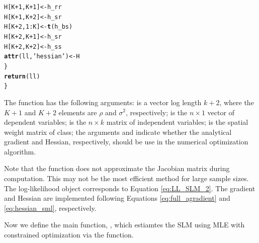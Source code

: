 \documentclass[english,12pt]{book}\usepackage[]{graphicx}\usepackage[]{xcolor}
\makeatletter
\newcommand{\hlnum}[1]{\textcolor[rgb]{0.686,0.059,0.569}{#1}}%
\newcommand{\hlsng}[1]{\textcolor[rgb]{0.192,0.494,0.8}{#1}}%
\newcommand{\hlopt}[1]{\textcolor[rgb]{0,0,0}{#1}}%
\newcommand{\hldef}[1]{\textcolor[rgb]{0.345,0.345,0.345}{#1}}%
\newcommand{\hlkwb}[1]{\textcolor[rgb]{0.69,0.353,0.396}{#1}}%
\newcommand{\hlkwd}[1]{\textcolor[rgb]{0.737,0.353,0.396}{\textbf{#1}}}%
\newenvironment{kframe}{%
 \def\at@end@of@kframe{}%
 \ifinner\ifhmode%
  \def\at@end@of@kframe{\end{minipage}}%
  \begin{minipage}{\columnwidth}%
 \fi\fi%
 \def\FrameCommand##1{\hskip\@totalleftmargin \hskip-\fboxsep
 \colorbox{shadecolor}{##1}\hskip-\fboxsep
     \hskip-\linewidth \hskip-\@totalleftmargin \hskip\columnwidth}%
 \MakeFramed {\advance\hsize-\width
   \@totalleftmargin\z@ \linewidth\hsize
   \@setminipage}}%
 {\par\unskip\endMakeFramed%
 \at@end@of@kframe}
\newenvironment{knitrout}{}{} %
\makeatother
\begin{document}
\begin{knitrout}
\begin{kframe}
\begin{alltt}
    \hldef{H[K} \hlopt{+} \hlnum{1}\hldef{, K} \hlopt{+} \hlnum{1}\hldef{]} \hlkwb{<-} \hldef{h_rr}
    \hldef{H[K} \hlopt{+} \hlnum{1}\hldef{, K} \hlopt{+} \hlnum{2}\hldef{]} \hlkwb{<-} \hldef{h_sr}
    \hldef{H[K} \hlopt{+} \hlnum{2}\hldef{,} \hlnum{1}\hlopt{:}\hldef{K]}   \hlkwb{<-} \hlkwd{t}\hldef{(h_bs)}
    \hldef{H[K} \hlopt{+} \hlnum{2}\hldef{, K} \hlopt{+} \hlnum{1}\hldef{]} \hlkwb{<-} \hldef{h_sr}
    \hldef{H[K} \hlopt{+} \hlnum{2}\hldef{, K} \hlopt{+} \hlnum{2}\hldef{]} \hlkwb{<-} \hldef{h_ss}
    \hlkwd{attr}\hldef{(ll,} \hlsng{'hessian'}\hldef{)} \hlkwb{<-} \hldef{H}
  \hldef{\}}
  \hlkwd{return}\hldef{(ll)}
\hldef{\}}
\end{alltt}
\end{kframe}
\end{knitrout}

The function  has the following arguments:  is a vector log length $k + 2$, where the $K + 1$ and $K + 2$ elements are $\rho$ and $\sigma^2$, respectively;  is the $n\times 1$ vector of dependent variables;  is the $n\times k$ matrix of independent variables;  is the spatial weight matrix of  class; the arguments  and  indicate whether the analytical gradient and Hessian, respectively, should be use in the numerical optimization algorithm. 

Note that the function does not approximate the Jacobian matrix during computation. This may not be the most efficient method for large sample sizes. The log-likelihood object  corresponds to Equation \eqref{eq:LL_SLM_2}. The gradient and Hessian are implemented following Equations \eqref{eq:full_agradient} and \eqref{eq:hessian_sml}, respectively.


Now we define the main function, , which estiamtes the SLM using MLE with constrained optimization via the  function.
\end{document}
